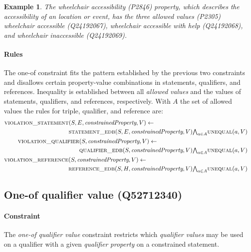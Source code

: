 \documentclass[hyperref,bachelorofscience,fleqn]{cgvpub}
\newtheorem{example}{Example}
\begin{document}
\begin{example}
The \emph{wheelchair accessibility} (P2846) property, which describes the accessibility of an location or event, has the three \emph{allowed values} (P2305) \emph{wheelchair accessible} (Q24192067), \emph{wheelchair accessible with help} (Q24192068), and \emph{wheelchair inaccessible} (Q24192069).
\end{example}

\paragraph{Rules}
The one-of constraint fits the pattern established by the previous two constraints and disallows certain property-value combinations in statements, qualifiers, and references. Inequality is established between all \emph{allowed values} and the values of statements, qualifiers, and references, respectively. With \(A\) the set of allowed values the rules for triple, qualifier, and reference are:
\begin{align}
\begin{split}
\textsc{violation\_statement}&(S, E, \emph{constrainedProperty}, V) \leftarrow \\
&\textsc{statement\_edb}(S, E, \emph{constrainedProperty}, V) {\textstyle\bigwedge}_{a \in A} \textsc{unequal}(a, V)
\end{split}\\
\begin{split}
\textsc{violation\_qualifier}&(S, \emph{constrainedProperty}, V) \leftarrow \\
&\textsc{qualifier\_edb}(S, \emph{constrainedProperty}, V) {\textstyle\bigwedge}_{a \in A} \textsc{unequal}(a, V)
\end{split}\\
\begin{split}
\textsc{violation\_reference}&(S, \emph{constrainedProperty}, V) \leftarrow \\
&\textsc{reference\_edb}(S, H, \emph{constrainedProperty}, V) {\textstyle\bigwedge}_{a \in A} \textsc{unequal}(a, V)
\end{split}
\end{align}

\subsection{One-of qualifier value (Q52712340)}
\paragraph{Constraint}
The \emph{one-of qualifier value} constraint restricts which \emph{qualifier values} may be used on a qualifier with a given \emph{qualifier property} on a constrained statement.
\end{document}
